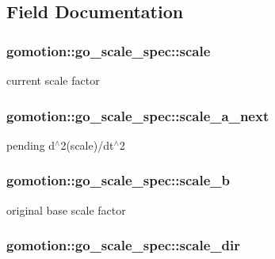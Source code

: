 \subsection{Field Documentation}
\hypertarget{structgomotion_1_1go__scale__spec_a592f5bd1c5d775d30e25b798900a2c30}{
\subsubsection[{scale}]{ gomotion\-::go\-\_\-scale\-\_\-spec\-::scale}}\label{structgomotion_1_1go__scale__spec_a592f5bd1c5d775d30e25b798900a2c30}


current scale factor 

\hypertarget{structgomotion_1_1go__scale__spec_a1786056a5451cb1841cf42f23f079c61}{
\subsubsection[{scale\-\_\-a\-\_\-next}]{ gomotion\-::go\-\_\-scale\-\_\-spec\-::scale\-\_\-a\-\_\-next}}\label{structgomotion_1_1go__scale__spec_a1786056a5451cb1841cf42f23f079c61}


pending d$^\wedge$2(scale)/dt$^\wedge$2 

\hypertarget{structgomotion_1_1go__scale__spec_ac734b7e45bc1da45992fdf6f1fdc792d}{
\subsubsection[{scale\-\_\-b}]{ gomotion\-::go\-\_\-scale\-\_\-spec\-::scale\-\_\-b}}\label{structgomotion_1_1go__scale__spec_ac734b7e45bc1da45992fdf6f1fdc792d}


original base scale factor 

\hypertarget{structgomotion_1_1go__scale__spec_af13cc2a23a17aba5aae5fbafc47a8428}{
\subsubsection[{scale\-\_\-dir}]{ gomotion\-::go\-\_\-scale\-\_\-spec\-::scale\-\_\-dir}}\label{structgomotion_1_1go__scale__spec_af13cc2a23a17aba5aae5fbafc47a8428}


